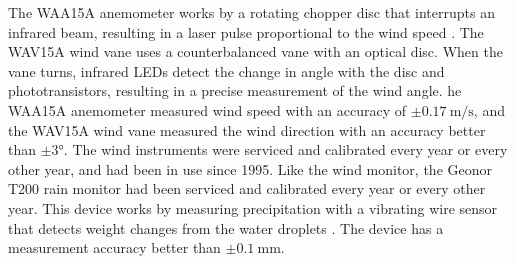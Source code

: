 The WAA15A anemometer works by a rotating chopper disc that interrupts an infrared beam, resulting in a laser pulse proportional to the wind speed \cite{vaisalaWindSetWA152021}. The WAV15A wind vane uses a counterbalanced vane with an optical disc. When the vane turns, infrared LEDs detect the change in angle with the disc and phototransistors, resulting in a precise measurement of the wind angle. he WAA15A anemometer measured wind speed with an accuracy of $\pm\SI{0.17}{\m\per\s}$, and the WAV15A wind vane measured the wind direction with an accuracy better than $\pm\ang{3}$. The wind instruments were serviced and calibrated every year or every other year, and had been in use since 1995. Like the wind monitor, the Geonor T200 rain monitor had been serviced and calibrated every year or every other year. This device works by measuring precipitation with a vibrating wire sensor that detects weight changes from the water droplets \cite{geonorinc.T200BSeriesAll2019}. The device has a measurement accuracy better than $\pm\SI{0.1}{\mm}$. 


